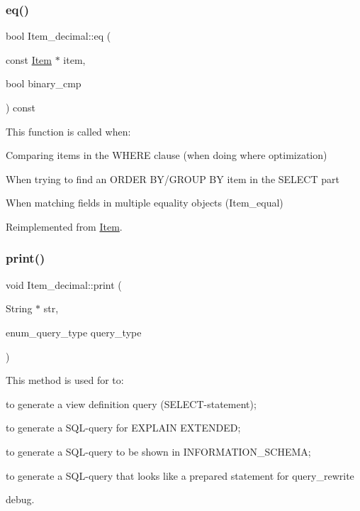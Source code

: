 \subsubsection{\texorpdfstring{eq()}{eq()}}
{\footnotesize\ttfamily bool Item\+\_\+decimal\+::eq (\begin{DoxyParamCaption}\item[{const \mbox{\hyperlink{classItem}{Item}} $\ast$}]{item,  }\item[{bool}]{binary\+\_\+cmp }\end{DoxyParamCaption}) const\hspace{0.3cm}{\ttfamily [virtual]}}

This function is called when\+:
\begin{DoxyItemize}
\item Comparing items in the W\+H\+E\+RE clause (when doing where optimization)
\item When trying to find an O\+R\+D\+ER B\+Y/\+G\+R\+O\+UP BY item in the S\+E\+L\+E\+CT part
\item When matching fields in multiple equality objects (Item\+\_\+equal) 
\end{DoxyItemize}

Reimplemented from \mbox{\hyperlink{classItem_af0957bbdb9a256de0cd29f1adcae28be}{Item}}.

\mbox{\label{classItem__decimal_aa6e14a49a63e7eab8ee478bf4372926d}} 
\subsubsection{\texorpdfstring{print()}{print()}}
{\footnotesize\ttfamily void Item\+\_\+decimal\+::print (\begin{DoxyParamCaption}\item[{String $\ast$}]{str,  }\item[{enum\+\_\+query\+\_\+type}]{query\+\_\+type }\end{DoxyParamCaption})\hspace{0.3cm}{\ttfamily [virtual]}}

This method is used for to\+:
\begin{DoxyItemize}
\item to generate a view definition query (S\+E\+L\+E\+CT-\/statement);
\item to generate a S\+QL-\/query for E\+X\+P\+L\+A\+IN E\+X\+T\+E\+N\+D\+ED;
\item to generate a S\+QL-\/query to be shown in I\+N\+F\+O\+R\+M\+A\+T\+I\+O\+N\+\_\+\+S\+C\+H\+E\+MA;
\item to generate a S\+QL-\/query that looks like a prepared statement for query\+\_\+rewrite
\item debug.
\end{DoxyItemize}

